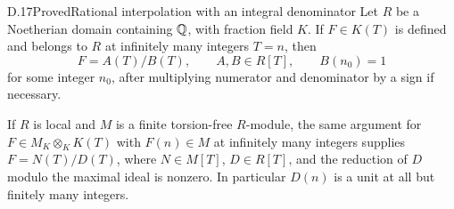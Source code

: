 \begin{statement}{D.17}{Proved}{Rational interpolation with an integral denominator}
Let $R$ be a Noetherian domain containing $\mathbb Q$, with fraction field
$K$. If $F\in K(T)$ is defined and belongs to $R$ at infinitely
many integers $T=n$, then
\[
       F=A(T)/B(T),\qquad A,B\in R[T],\qquad B(n_0)=1
\]
for some integer $n_0$, after multiplying numerator and denominator
by a sign if necessary.

If $R$ is local and $M$ is a finite torsion-free $R$-module, the
same argument for $F\in M_K\otimes_K K(T)$ with $F(n)\in M$
at infinitely many integers supplies
$F=N(T)/D(T)$, where $N\in M[T]$, $D\in R[T]$, and the
reduction of $D$ modulo the maximal ideal is nonzero. In particular
$D(n)$ is a unit at all but finitely many integers.
\end{statement}
